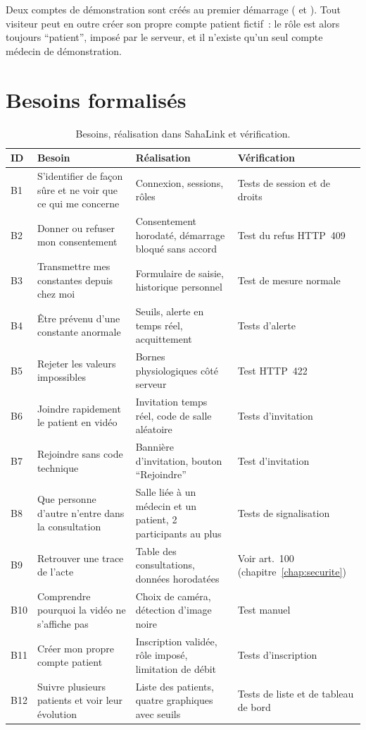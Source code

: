 Deux comptes de démonstration sont créés au premier démarrage ( et ). Tout visiteur peut en outre créer son propre compte patient fictif~: le rôle est alors toujours \enquote{patient}, imposé par le serveur, et il n'existe qu'un seul compte médecin de démonstration.

\section{Besoins formalisés}

\begin{table}[H]
\centering
\caption{Besoins, réalisation dans SahaLink et vérification.}
\label{tab:besoins}
\small
\begin{tabularx}{\textwidth}{@{}l X X X@{}}
\toprule
\textbf{ID} & \textbf{Besoin} & \textbf{Réalisation} & \textbf{Vérification} \\
\midrule
B1 & S'identifier de façon sûre et ne voir que ce qui me concerne & Connexion, sessions, rôles & Tests de session et de droits \\
B2 & Donner ou refuser mon consentement & Consentement horodaté, démarrage bloqué sans accord & Test du refus HTTP~409 \\
B3 & Transmettre mes constantes depuis chez moi & Formulaire de saisie, historique personnel & Test de mesure normale \\
B4 & Être prévenu d'une constante anormale & Seuils, alerte en temps réel, acquittement & Tests d'alerte \\
B5 & Rejeter les valeurs impossibles & Bornes physiologiques côté serveur & Test HTTP~422 \\
B6 & Joindre rapidement le patient en vidéo & Invitation temps réel, code de salle aléatoire & Tests d'invitation \\
B7 & Rejoindre sans code technique & Bannière d'invitation, bouton \enquote{Rejoindre} & Test d'invitation \\
B8 & Que personne d'autre n'entre dans la consultation & Salle liée à un médecin et un patient, 2 participants au plus & Tests de signalisation \\
B9 & Retrouver une trace de l'acte & Table des consultations, données horodatées & Voir art.~100 (chapitre~\ref{chap:securite}) \\
B10 & Comprendre pourquoi la vidéo ne s'affiche pas & Choix de caméra, détection d'image noire & Test manuel \\
B11 & Créer mon propre compte patient & Inscription validée, rôle imposé, limitation de débit & Tests d'inscription \\
B12 & Suivre plusieurs patients et voir leur évolution & Liste des patients, quatre graphiques avec seuils & Tests de liste et de tableau de bord \\
\bottomrule
\end{tabularx}
\end{table}

